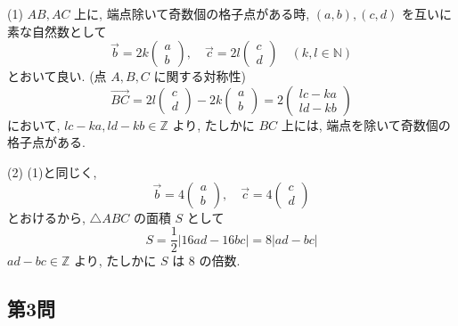 \documentclass[../main.tex]{subfiles}
\begin{document}
(1) $AB, AC$ 上に, 端点除いて奇数個の格子点がある時, $(a,b), (c,d)$ を互いに素な自然数として
\[
  \vec{b} = 2k
  \begin{pmatrix} a \\ b
  \end{pmatrix}, \quad \vec{c} = 2l
  \begin{pmatrix} c \\ d
  \end{pmatrix} \quad (k, l \in \mathbb{N})
\]
とおいて良い. (点 $A, B, C$ に関する対称性)
\[
  \vec{BC} = 2l
  \begin{pmatrix} c \\ d
  \end{pmatrix} - 2k
  \begin{pmatrix} a \\ b
  \end{pmatrix} = 2
  \begin{pmatrix} lc - ka \\ ld - kb
  \end{pmatrix}
\]
において, $lc - ka, ld - kb \in \mathbb{Z}$ より, たしかに $BC$ 上には, 端点を除いて奇数個の格子点がある.

\bigskip

(2) (1)と同じく,
\[
  \vec{b} = 4
  \begin{pmatrix} a \\ b
  \end{pmatrix}, \quad \vec{c} = 4
  \begin{pmatrix} c \\ d
  \end{pmatrix}
\]
とおけるから, $\triangle ABC$ の面積 $S$ として
\[
  S = \frac{1}{2} | 16 ad - 16 bc | = 8 |ad - bc|
\]
$ad - bc \in \mathbb{Z}$ より, たしかに $S$ は 8 の倍数.

\begin{center}
\end{center}

\newpage

\subsection*{第3問}
\end{document}
